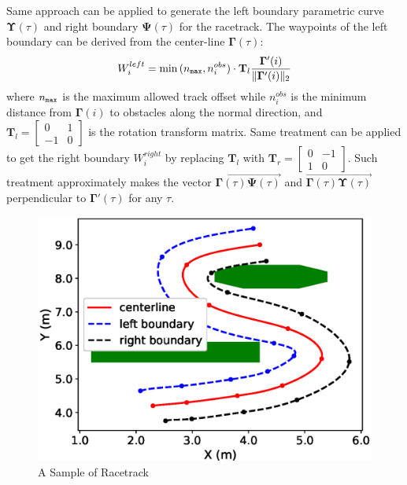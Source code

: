 \documentclass[conference, onecolumn]{IEEEtran}
\begin{document}
Same approach can be applied to generate the left boundary parametric curve $\mathbf{\Upsilon}(\tau)$ and right boundary $\mathbf{\Psi}(\tau)$ for the racetrack. The waypoints of the left boundary can be derived from the center-line $\mathbf{\Gamma}(\tau)$:
\begin{equation}\label{innerwaypoint}
	W_i^{left} = \min{(n_{\tt max},n_i^{obs})}\cdot  	\mathbf{T}_{l} \frac{\mathbf{\Gamma}'(i)}{\| \mathbf{\Gamma}'(i)\|_2 }
\end{equation} 
where $n_{\tt max}$ is the maximum allowed track offset while $n_i^{obs}$ is the minimum distance from $\mathbf{\Gamma}(i)$ to obstacles along the normal direction, and $\mathbf{T}_{l}=\begin{bmatrix}
	0 & 1 \\
	-1 & 0
\end{bmatrix}$ is the rotation transform matrix.
Same treatment can be applied to get the right boundary $W_i^{right}$ by replacing $\mathbf{T}_l$ with $\mathbf{T}_{r}=\begin{bmatrix}
	0 & -1 \\
	1 & 0
\end{bmatrix}$.
Such treatment approximately makes the vector $\overrightarrow{\mathbf{\Gamma}(\tau)\mathbf{\Psi}(\tau)}$ and $\overrightarrow{\mathbf{\Gamma}(\tau)\mathbf{\Upsilon}(\tau)}$ perpendicular to $\mathbf{\Gamma}'(\tau)$ for any $\tau$.

\begin{figure}
	\centering
	\includegraphics[scale=0.5]{racetrack.eps}
	\caption{A Sample of Racetrack}
	\label{fig_racetrack}
\end{figure}
\end{document}
